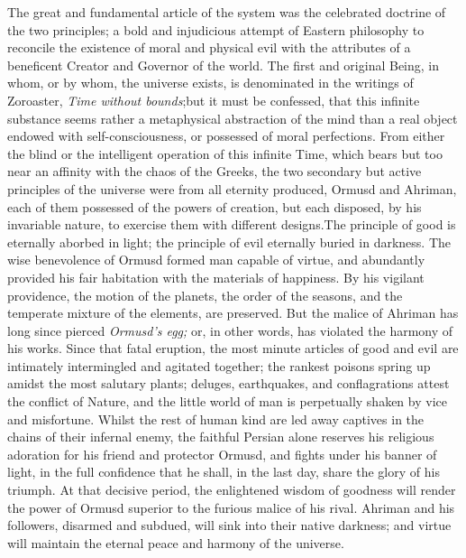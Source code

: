 The great and fundamental article of the system was the
celebrated doctrine of the two principles; a bold and injudicious
attempt of Eastern philosophy to reconcile the existence of moral
and physical evil with the attributes of a beneficent Creator and
Governor of the world. The first and original Being, in whom, or
by whom, the universe exists, is denominated in the writings of
Zoroaster, \textit{Time without bounds};\footnotemark[1001] but it must be confessed,
that this infinite substance seems rather a metaphysical
abstraction of the mind than a real object endowed with
self-consciousness, or possessed of moral perfections. From
either the blind or the intelligent operation of this infinite
Time, which bears but too near an affinity with the chaos of the
Greeks, the two secondary but active principles of the universe
were from all eternity produced, Ormusd and Ahriman, each of them
possessed of the powers of creation, but each disposed, by his
invariable nature, to exercise them with different designs.\footnotemark[1002]
The principle of good is eternally aborbed in light; the
principle of evil eternally buried in darkness. The wise
benevolence of Ormusd formed man capable of virtue, and
abundantly provided his fair habitation with the materials of
happiness. By his vigilant providence, the motion of the planets,
the order of the seasons, and the temperate mixture of the
elements, are preserved. But the malice of Ahriman has long since
pierced \textit{Ormusd’s egg;} or, in other words, has violated the
harmony of his works. Since that fatal eruption, the most minute
articles of good and evil are intimately intermingled and
agitated together; the rankest poisons spring up amidst the most
salutary plants; deluges, earthquakes, and conflagrations attest
the conflict of Nature, and the little world of man is
perpetually shaken by vice and misfortune. Whilst the rest of
human kind are led away captives in the chains of their infernal
enemy, the faithful Persian alone reserves his religious
adoration for his friend and protector Ormusd, and fights under
his banner of light, in the full confidence that he shall, in the
last day, share the glory of his triumph. At that decisive
period, the enlightened wisdom of goodness will render the power
of Ormusd superior to the furious malice of his rival. Ahriman
and his followers, disarmed and subdued, will sink into their
native darkness; and virtue will maintain the eternal peace and
harmony of the universe.\footnotemark[11] \footnotemark[1101]


